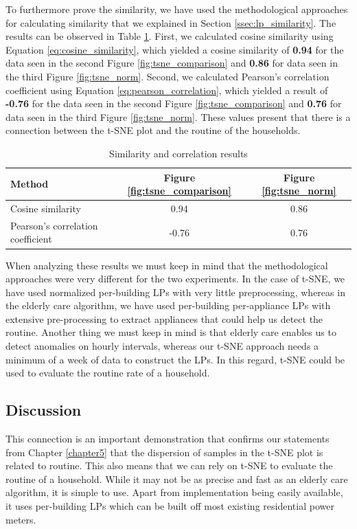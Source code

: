To furthermore prove the similarity, we have used the methodological approaches for calculating similarity that we explained in Section \ref{ssec:lp_similarity}.
The results can be observed in Table \ref{tab:similarity_results}.
First, we calculated cosine similarity using Equation \ref{eq:cosine_similarity}, which yielded a cosine similarity of \textbf{0.94}  for the data seen in the second Figure \ref{fig:tsne_comparison} and \textbf{0.86} for data seen in the third Figure \ref{fig:tsne_norm}.
Second, we calculated Pearson's correlation coefficient using Equation \ref{eq:pearson_correlation}, which yielded a result of \textbf{-0.76} for the data seen in the second Figure \ref{fig:tsne_comparison} and \textbf{0.76} for data seen in the third Figure \ref{fig:tsne_norm}.
These values present that there is a connection between the t-SNE plot and the routine of the households.

\begin{table}[ht]
    \centering
    \caption{Similarity and correlation results}
    \label{tab:similarity_results}
    \begin{tabular}{@{}lcc@{}}
    \toprule
    \textbf{Method} & \textbf{Figure \ref{fig:tsne_comparison}} & \textbf{Figure \ref{fig:tsne_norm}} \\ \midrule
    Cosine similarity & 0.94 & 0.86 \\
    Pearson's correlation coefficient & -0.76 & 0.76 \\ \bottomrule
    \end{tabular}
\end{table}

When analyzing these results we must keep in mind that the methodological approaches were very different for the two experiments.
In the case of t-SNE, we have used normalized per-building LPs with very little preprocessing, whereas in the elderly care algorithm, we have used per-building per-appliance LPs with extensive pre-processing to extract appliances that could help us detect the routine.
Another thing we must keep in mind is that elderly care enables us to detect anomalies on hourly intervals, whereas our t-SNE approach needs a minimum of a week of data to construct the LPs.
In this regard, t-SNE could be used to evaluate the routine rate of a household.

\subsection{Discussion}
This connection is an important demonstration that confirms our statements from Chapter \ref{chapter5} that the dispersion of samples in the t-SNE plot is related to routine.
This also means that we can rely on t-SNE to evaluate the routine of a household.
While it may not be as precise and fast as an elderly care algorithm, it is simple to use. 
Apart from implementation being easily available, it uses per-building LPs which can be built off most existing residential power meters.


